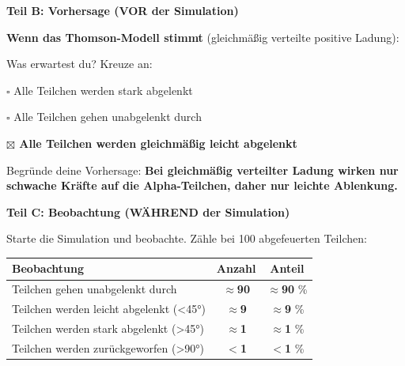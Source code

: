 \documentclass[10pt, a4paper]{article}
\newcommand{\fachfarbe}{physik}
\newcommand{\lsg}[1]{\textcolor{loesung}{\textbf{#1}}}
\newcommand{\abschnitt}[1]{%
    \vspace{8pt}
    \noindent\textbf{\textcolor{\fachfarbe}{#1}}
    \vspace{4pt}
}
\begin{document}
\vspace{8pt}


\abschnitt{Teil B: Vorhersage (VOR der Simulation)}

\textbf{Wenn das Thomson-Modell stimmt} (gleichmäßig verteilte positive Ladung):

Was erwartest du? Kreuze an:

\vspace{4pt}

$\square$ Alle Teilchen werden stark abgelenkt

$\square$ Alle Teilchen gehen unabgelenkt durch

\lsg{$\boxtimes$ Alle Teilchen werden gleichmäßig leicht abgelenkt}

\vspace{6pt}

Begründe deine Vorhersage: \lsg{Bei gleichmäßig verteilter Ladung wirken nur schwache Kräfte auf die Alpha-Teilchen, daher nur leichte Ablenkung.}

\vspace{8pt}


\abschnitt{Teil C: Beobachtung (WÄHREND der Simulation)}

Starte die Simulation und beobachte. Zähle bei 100 abgefeuerten Teilchen:

\vspace{6pt}

\begin{tabular}{|p{6cm}|c|c|}
\hline
\textbf{Beobachtung} & \textbf{Anzahl} & \textbf{Anteil} \\
\hline
Teilchen gehen unabgelenkt durch & \lsg{$\approx$90} & \lsg{$\approx$90} \% \\
\hline
Teilchen werden leicht abgelenkt (<45°) & \lsg{$\approx$9} & \lsg{$\approx$9} \% \\
\hline
Teilchen werden stark abgelenkt (>45°) & \lsg{$\approx$1} & \lsg{$\approx$1} \% \\
\hline
Teilchen werden zurückgeworfen (>90°) & \lsg{$<$1} & \lsg{$<$1} \% \\
\hline
\end{tabular}
\end{document}
